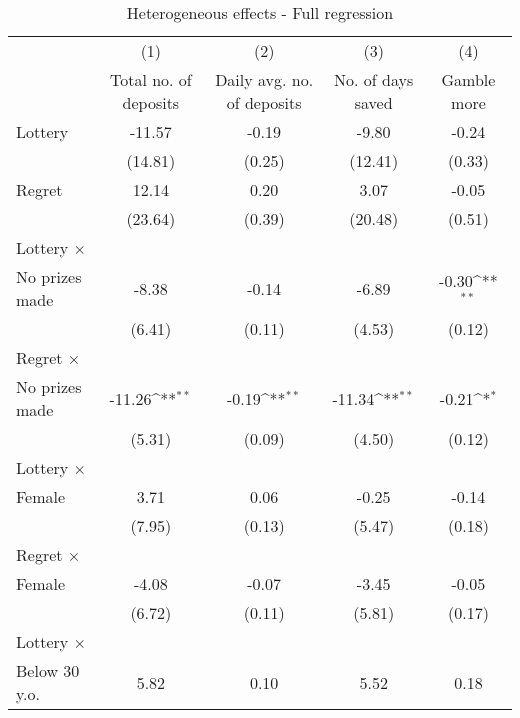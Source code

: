 \begin{table}[htbp]\centering
\def\sym#1{\ifmmode^{#1}\else\(^{#1}\)\fi}
\caption{Heterogeneous effects - Full regression}
\begin{tabular}{l*{4}{c}}
\toprule
                &\multicolumn{1}{c}{(1)}&\multicolumn{1}{c}{(2)}&\multicolumn{1}{c}{(3)}&\multicolumn{1}{c}{(4)}\\
                &\multicolumn{1}{c}{Total no. of deposits}&\multicolumn{1}{c}{Daily avg. no. of deposits}&\multicolumn{1}{c}{No. of days saved}&\multicolumn{1}{c}{Gamble more}\\
\midrule
Lottery         &   -11.57         &    -0.19         &    -9.80         &    -0.24         \\
                &  (14.81)         &   (0.25)         &  (12.41)         &   (0.33)         \\
\addlinespace
Regret          &    12.14         &     0.20         &     3.07         &    -0.05         \\
                &  (23.64)         &   (0.39)         &  (20.48)         &   (0.51)         \\
\addlinespace
Lottery $\times$ \\ No prizes made&    -8.38         &    -0.14         &    -6.89         &    -0.30\sym{**} \\
                &   (6.41)         &   (0.11)         &   (4.53)         &   (0.12)         \\
\addlinespace
Regret $\times$ \\ No prizes made&   -11.26\sym{**} &    -0.19\sym{**} &   -11.34\sym{**} &    -0.21\sym{*}  \\
                &   (5.31)         &   (0.09)         &   (4.50)         &   (0.12)         \\
\addlinespace
Lottery $\times$ \\ Female&     3.71         &     0.06         &    -0.25         &    -0.14         \\
                &   (7.95)         &   (0.13)         &   (5.47)         &   (0.18)         \\
\addlinespace
Regret $\times$ \\ Female&    -4.08         &    -0.07         &    -3.45         &    -0.05         \\
                &   (6.72)         &   (0.11)         &   (5.81)         &   (0.17)         \\
\addlinespace
Lottery $\times$ \\ Below 30 y.o.&     5.82         &     0.10         &     5.52         &     0.18         \\

\end{tabular}
\end{table}
